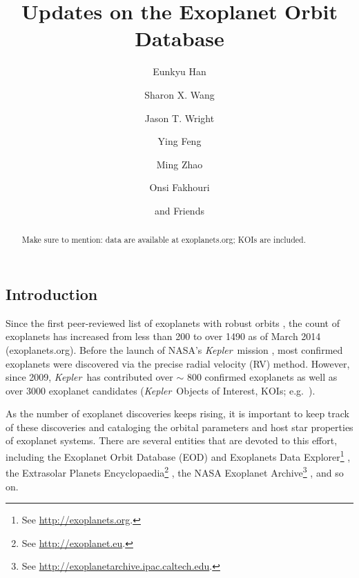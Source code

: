 \documentclass[11pt,preprint]{aastex}
\def\kepler{\textit{Kepler}}
\begin{document}
\begin{CJK*}{UTF8}{gbsn}

\title{Updates on the Exoplanet Orbit Database}

\author{Eunkyu Han}
\author{Sharon X. Wang}
\author{Jason T. Wright}
\author{Ying Feng}
\author{Ming Zhao}
\author{Onsi Fakhouri}
\author{and Friends}



\begin{abstract}
Make sure to mention: data are available at exoplanets.org; KOIs are included.
\end{abstract}  

\section{Introduction}\label{sec:intro}

Since the first peer-reviewed list of exoplanets with robust orbits
\citep{Butler2002,Butler2006}, the count of exoplanets has increased
from less than 200 to over 1490 as of March 2014
(exoplanets.org). Before the launch of NASA's \kepler\ mission
\citep{Borucki2010}, most confirmed exoplanets were discovered via the
precise radial velocity (RV) method. However, since 2009, \kepler\ has
contributed over $\sim$ 800 confirmed exoplanets
\citep[e.g.,][]{Rowe2014} as well as over 3000 exoplanet candidates
(\kepler\ Objects of Interest, KOIs; e.g.~\citealt{Batalha2013}).

As the number of exoplanet discoveries keeps rising, it is important
to keep track of these discoveries and cataloging the orbital
parameters and host star properties of exoplanet systems. There are
several entities that are devoted to this effort, including the
Exoplanet Orbit Database (EOD) and Exoplanets Data Explorer\footnote{See
  \url{http://exoplanets.org}.} \citep{Wright2011}, the Extrasolar
Planets Encyclopaedia\footnote{See \url{http://exoplanet.eu}.}
\citep{Schneider2011}, the NASA Exoplanet Archive\footnote{See
  \url{http://exoplanetarchive.ipac.caltech.edu}.}
\citep{Akeson2013}, and so on.


\end{CJK*}
\end{document}
